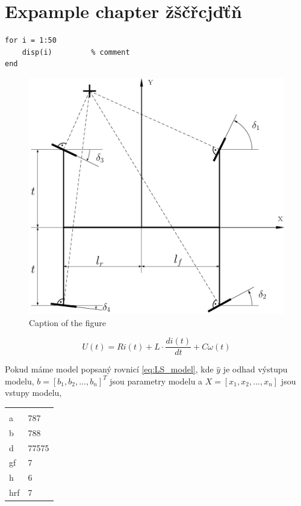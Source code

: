 \chapter{Expample chapter žščřcjďťň}
\label{chap:Expample}

\lipsum[1]

\begin{lstlisting}
for i = 1:50
	disp(i)			% comment         
end
\end{lstlisting}

\begin{figure}[!h] 
	\begin{center}
		\includegraphics[scale=0.4]{images/example_fig.pdf}
	\end{center}
	\caption[Caption in list of figures]{Caption of the figure}
	\label{fig:figurelabel}
\end{figure}	

\lipsum[2]

\begin{equation}\label{eq:DCmot}
U(t) = Ri(t) + L\cdot\frac{di(t)}{dt} + C\omega(t)
\end{equation}

Pokud máme model popsaný rovnicí \ref{eq:LS_model}, kde \boldmath $\hat{y}$ je odhad výstupu modelu, $b = \left[b_1,b_2,...,b_n\right]^T$ jsou parametry modelu a $X = \left[x_1,x_2,...,x_n\right]$ jsou vstupy modelu, \unboldmath

\begin{center}
	\begin{tabular}{ll}
		&  \\ 
		a & 787 \\ 
		b & 788 \\ 
		d & 77575 \\ 
		gf & 7 \\ 
		h & 6 \\ 
		hrf & 7 \\ 
	\end{tabular} 
\end{center}



